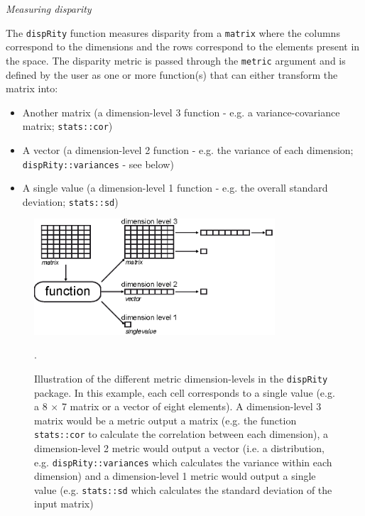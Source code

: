 \documentclass[12pt,letterpaper]{article}
\renewcommand{\subsection}[1]{%
\bigskip
\begin{center}
\begin{large}
\normalfont\itshape #1
\end{large}
\end{center}}
\newcommand{\disp}{\texttt{dispRity} }
\begin{document}
\subsection{Measuring disparity}
The \disp function measures disparity from a \texttt{matrix} where the columns correspond to the dimensions and the rows correspond to the elements present in the space.
The disparity metric is passed through the \texttt{metric} argument and is defined by the user as one or more function(s) that can either transform the matrix into:

\begin{itemize}
    \item Another matrix (a dimension-level 3 function - e.g. a variance-covariance matrix; \texttt{stats::cor})
    \item A vector (a dimension-level 2 function - e.g. the variance of each dimension; \texttt{dispRity::variances} - see below)
    \item A single value (a dimension-level 1 function - e.g. the overall standard deviation; \texttt{stats::sd})
\end{itemize}

\begin{figure}[!htbp]
\centering
   \includegraphics[width=0.8\textwidth]{dispRity_fun.eps}  %
\caption{Illustration of the different metric dimension-levels in the \disp package. In this example, each cell corresponds to a single value (e.g. a 8 $\times$ 7 matrix or a vector of eight elements).
A dimension-level 3 matrix would be a metric output a matrix (e.g. the function \texttt{stats::cor} to calculate the correlation between each dimension), a dimension-level 2 metric would output a vector (i.e. a distribution, e.g. \texttt{dispRity::variances} which calculates the variance within each dimension) and a dimension-level 1 metric would output a single value (e.g. \texttt{stats::sd} which calculates the standard deviation of the input matrix)}.
\label{Fig:levels}
\end{figure}
\end{document}

